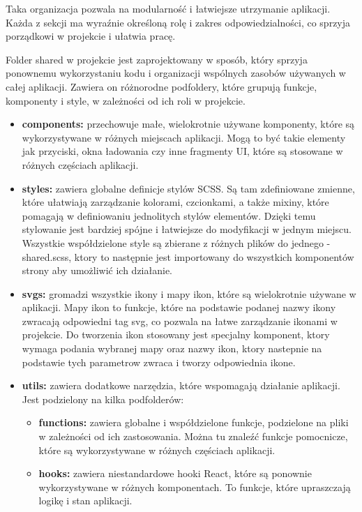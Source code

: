 \documentclass[12pt,a4paper]{article}
\begin{document}
Taka organizacja pozwala na modularność i łatwiejsze utrzymanie aplikacji. Każda z sekcji ma wyraźnie określoną rolę i zakres odpowiedzialności, co sprzyja porządkowi w projekcie i ułatwia pracę.

\newpage
Folder shared w projekcie jest zaprojektowany w sposób, który sprzyja ponownemu wykorzystaniu kodu i organizacji wspólnych zasobów używanych w całej aplikacji. Zawiera on różnorodne podfoldery, które grupują funkcje, komponenty i style, w zależności od ich roli w projekcie.

\begin{itemize}
    \item \textbf{components:} przechowuje małe, wielokrotnie używane komponenty, które są wykorzystywane w różnych miejscach aplikacji. Mogą to być takie elementy jak  przyciski, okna ładowania czy inne fragmenty UI, które są stosowane w różnych częściach aplikacji.
    \item \textbf{styles:} zawiera globalne definicje stylów SCSS. Są tam zdefiniowane zmienne, które ułatwiają zarządzanie kolorami, czcionkami, a także mixiny, które pomagają w definiowaniu jednolitych stylów elementów. Dzięki temu stylowanie jest bardziej spójne i łatwiejsze do modyfikacji w jednym miejscu. Wszystkie współdzielone style są zbierane z różnych plików do jednego - shared.scss, ktory to następnie jest importowany do wszystkich komponentów strony aby umożliwić ich działanie.
    \item \textbf{svgs:} gromadzi wszystkie ikony i mapy ikon, które są wielokrotnie używane w aplikacji. Mapy ikon to funkcje, które na podstawie podanej nazwy ikony zwracają odpowiedni tag svg, co pozwala na łatwe zarządzanie ikonami w projekcie. Do tworzenia ikon stosowany jest specjalny komponent, ktory wymaga podania wybranej mapy oraz nazwy ikon, ktory nastepnie na podstawie tych parametrow zwraca i tworzy odpowiednia ikone.
    \item \textbf{utils:} zawiera dodatkowe narzędzia, które wspomagają działanie aplikacji. Jest podzielony na kilka podfolderów:
    \begin{itemize}
        \item \textbf{functions:} zawiera globalne i współdzielone funkcje, podzielone na pliki w zależności od ich zastosowania. Można tu znaleźć funkcje pomocnicze, które są wykorzystywane w różnych częściach aplikacji.
        \item \textbf{hooks:} zawiera niestandardowe hooki React, które są ponownie wykorzystywane w różnych komponentach. To funkcje, które upraszczają logikę i stan aplikacji.

\end{itemize}
\end{itemize}
\end{document}

